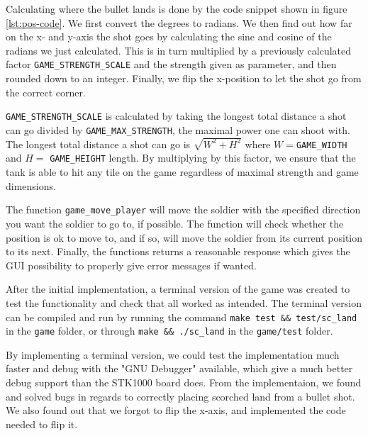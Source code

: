 

Calculating where the bullet lands is done by the code snippet shown in
figure \ref{lst:pos-code}. We first convert the degrees to radians. We
then find out how far on the x- and y-axis the shot goes by calculating
the sine and cosine of the radians we just calculated. This is in turn
multiplied by a previously calculated factor
\texttt{GAME\_STRENGTH\_SCALE} and the strength given as parameter, and
then rounded down to an integer. Finally, we flip the x-position to
let the shot go from the correct corner.

\texttt{GAME\_STRENGTH\_SCALE} is calculated by taking the longest total
distance a shot can go divided by \texttt{GAME\_MAX\_STRENGTH}, the
maximal power one can shoot with.  The longest total distance a shot can
go is $\sqrt{W^2 + H^2}$ where $W = $\texttt{GAME\_WIDTH} and $H =$
\texttt{GAME\_HEIGHT} length.  By multiplying by this factor, we ensure
that the tank is able to hit any tile on the game regardless of maximal
strength and game dimensions. 



The function \texttt{game\_move\_player} will move the soldier with the
specified direction you want the soldier to go to, if possible. The
function will check whether the position is ok to move to, and if so,
will move the soldier from its current position to its next. Finally,
the functions returns a reasonable response which gives the GUI
possibility to properly give error messages if wanted.

After the initial implementation, a terminal version of the game was
created to test the functionality and check that all worked as intended.
The terminal version can be compiled and run by running the command 
\verb|make test && test/sc_land| in the \texttt{game} folder, or
through \verb|make && ./sc_land| in the \texttt{game/test} folder.



By implementing a terminal version, we could test the implementation
much faster and debug with the "GNU Debugger" available, which give a
much better debug support than the STK1000 board does. From the
implementaion, we found and solved bugs in regards to correctly placing
scorched land from a bullet shot. We also found out that we forgot to
flip the x-axis, and implemented the code needed to flip it.


